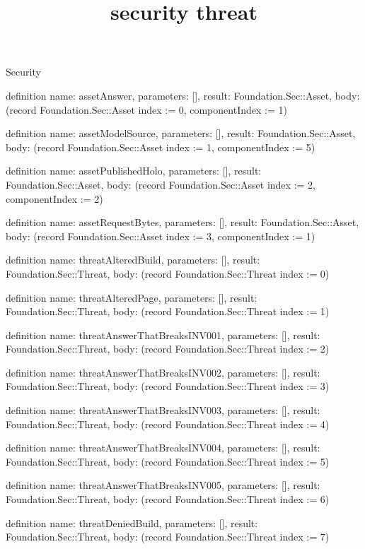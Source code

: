 \begin{lexlean}{Security}
\title{security threat}
\begin{semanticmodule}
definition{
  name: assetAnswer,
  parameters: [],
  result: Foundation.Sec::Asset,
  body: (record Foundation.Sec::Asset {index := 0, componentIndex := 1})
}

definition{
  name: assetModelSource,
  parameters: [],
  result: Foundation.Sec::Asset,
  body: (record Foundation.Sec::Asset {index := 1, componentIndex := 5})
}

definition{
  name: assetPublishedHolo,
  parameters: [],
  result: Foundation.Sec::Asset,
  body: (record Foundation.Sec::Asset {index := 2, componentIndex := 2})
}

definition{
  name: assetRequestBytes,
  parameters: [],
  result: Foundation.Sec::Asset,
  body: (record Foundation.Sec::Asset {index := 3, componentIndex := 1})
}

definition{
  name: threatAlteredBuild,
  parameters: [],
  result: Foundation.Sec::Threat,
  body: (record Foundation.Sec::Threat {index := 0})
}

definition{
  name: threatAlteredPage,
  parameters: [],
  result: Foundation.Sec::Threat,
  body: (record Foundation.Sec::Threat {index := 1})
}

definition{
  name: threatAnswerThatBreaksINV001,
  parameters: [],
  result: Foundation.Sec::Threat,
  body: (record Foundation.Sec::Threat {index := 2})
}

definition{
  name: threatAnswerThatBreaksINV002,
  parameters: [],
  result: Foundation.Sec::Threat,
  body: (record Foundation.Sec::Threat {index := 3})
}

definition{
  name: threatAnswerThatBreaksINV003,
  parameters: [],
  result: Foundation.Sec::Threat,
  body: (record Foundation.Sec::Threat {index := 4})
}

definition{
  name: threatAnswerThatBreaksINV004,
  parameters: [],
  result: Foundation.Sec::Threat,
  body: (record Foundation.Sec::Threat {index := 5})
}

definition{
  name: threatAnswerThatBreaksINV005,
  parameters: [],
  result: Foundation.Sec::Threat,
  body: (record Foundation.Sec::Threat {index := 6})
}

definition{
  name: threatDeniedBuild,
  parameters: [],
  result: Foundation.Sec::Threat,
  body: (record Foundation.Sec::Threat {index := 7})
}


\end{semanticmodule}
\end{lexlean}
